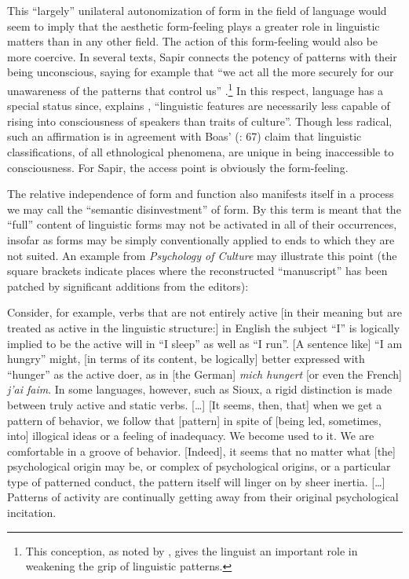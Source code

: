 \documentclass[output=paper]{langscibook}
\begin{document}
This ``largely'' unilateral autonomization of form in the field of language would seem to imply that the aesthetic form-feeling plays a greater role in linguistic matters than in any other field. The action of this form-feeling would also be more coercive. In several texts, Sapir connects the potency of patterns with their being unconscious, saying for example that ``we act all the more securely for our unawareness of the patterns that control us'' \citep[549]{Sapir1927a}.\footnote{This conception, as noted by \citet{Joseph2002}, gives the linguist an important role in weakening the grip of linguistic patterns.} In this respect, language has a special status since, explains \citet[100]{Sapir1912}, ``linguistic features are necessarily less capable of rising into consciousness of speakers than traits of culture''. Though less radical, such an affirmation is in agreement with Boas' (\citeyear{Boas1911}: 67) claim that linguistic classifications, of all ethnological phenomena, are unique in being inaccessible to consciousness. For Sapir, the access point is obviously the form-feeling. 

The relative independence of form and function also manifests itself in a process we may call the ``semantic disinvestment'' of form. By this term is meant that the ``full'' content of linguistic forms may not be activated in all of their occurrences, insofar as forms may be simply conventionally applied to ends to which they are not suited. An example from \emph{Psychology of Culture} may illustrate this point (the square brackets indicate places where the reconstructed ``manuscript'' has been patched by significant additions from the editors): 

\begin{modquote}
Consider, for example, verbs that are not entirely active [in their meaning but are treated as active in the linguistic structure:] in English the subject ``I'' is logically implied to be the active will in ``I sleep'' as well as ``I run''. [A sentence like] ``I am hungry'' might, [in terms of its content, be logically] better expressed with ``hunger'' as the active doer, as in [the German] \emph{mich hungert} [or even the French] \emph{j’ai faim}. In some languages, however, such as Sioux, a rigid distinction is made between truly active and static verbs. […] [It seems, then, that] when we get a pattern of behavior, we follow that [pattern] in spite of [being led, sometimes, into] illogical ideas or a feeling of inadequacy. We become used to it. We are comfortable in a groove of behavior. [Indeed], it seems that no matter what [the] psychological origin may be, or complex of psychological origins, or a particular type of patterned conduct, the pattern itself will linger on by sheer inertia. […] Patterns of activity are continually getting away from their original psychological incitation. \citep[109--110]{Sapir2002}
\end{modquote}
\end{document}
